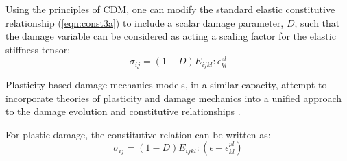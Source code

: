 Using the principles of CDM, one can modify the standard elastic constitutive relationship (\ref{eqn:const3a}) to include a scalar damage parameter, $D$, such that the damage variable can be considered as acting a scaling factor for the elastic stiffness tensor: 
\begin{equation}
\sigma_{ij}=\left(1-D\right)E_{ijkl}:\epsilon_{kl}^{el}
\label{eqn:const3}
\end{equation}





Plasticity based damage mechanics models, in a similar capacity, attempt to incorporate theories of plasticity and damage mechanics into a unified approach to the damage evolution and constitutive relationships \cite{zhang_continuum_2010}. 

For plastic damage, the constitutive relation can be written as:
\begin{equation}
\sigma_{ij}=\left(1-D\right)E_{ijkl}:\left(\epsilon-\epsilon^{pl}_{kl}\right)
\label{eqn:const5}
\end{equation}

